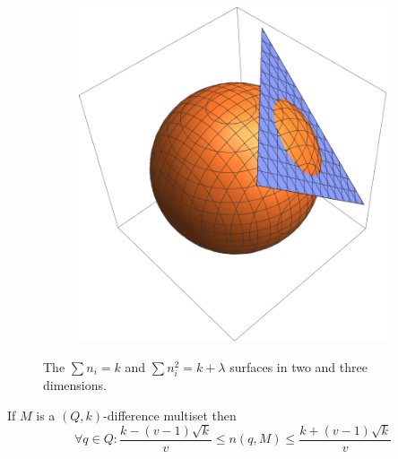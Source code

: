 \begin{figure}
\begin{subfigure}[b]{0.5\textwidth}
            \includegraphics[width=\textwidth]{assets/surfacesIn3D}
        \end{subfigure}
        \caption{The $\sum {n_i} = k$ and $\sum n_i^2 = k + \lambda$ surfaces in two and three dimensions.}
        \label{general:figure:surfaces}
    \end{figure}
        
    \begin{theorem}
        \label{general:theorem:limits}
        If $M$ is a $(Q,k)$-difference multiset then
        \begin{equation}
            \forall q \in Q \colon \frac{k-(v-1)\sqrt k}{v} \leq n(q,M) \leq \frac{k+(v-1)\sqrt k}{v}
        \end{equation}
    \end{theorem}
    
